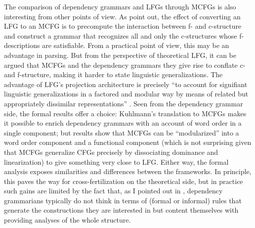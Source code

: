 \documentclass[output=paper,hidelinks]{langscibook}
\begin{document}
The comparison of dependency grammars and LFGs through MCFGs is also
interesting from other points of view. As \citet{wed:kap:20} point
out, the effect of converting an LFG to an MCFG is to precompute the
interaction between f- and c-structure and construct a grammar that
recognizes all and only the c-structures whose f-descriptions are
satisfiable. From a practical point of view, this may be an advantage
in parsing. But from the perspective of theoretical LFG, it can be
argued that MCFGs and the dependency grammars they give rise to
conflate c- and f-structure, making it harder to state linguistic
generalizations. The advantage of LFG's projection architecture is
precisely ``to account for signifiant linguistic generalizations in
a factored and modular way by means of related but appropriately
dissimilar representations'' \citep[309]{kapl:89}. Seen from the
dependency grammar side, the formal results offer a choice:
Kuhlmann's translation to MCFGs makes it possible to enrich dependency
grammars with an account of word order in a single component; but
 results show that MCFGs can be ``modularized''
into a word order component and a functional component (which is not
surprising given that MCFGs generalize CFGs precisely by dissociating
dominance and linearization) to give something very close to LFG.
Either way, the formal analysis exposes similarities and differences
between the frameworks. In principle, this paves the way for
cross-fertilization on the theoretical side, but in practice such
gains are limited by the fact that, as I pointed out in
, dependency grammarians typically do not think
in terms of (formal or informal) rules that generate the constructions
they are interested in but content themselves with providing analyses
of the whole structure.

\end{document}
